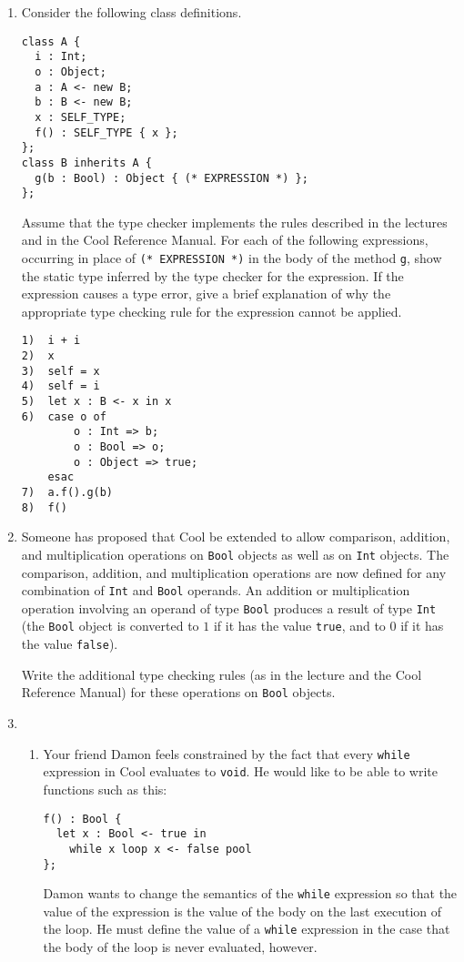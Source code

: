 \documentclass[11pt]{article}
\begin{document}
\begin{enumerate}

\item Consider the following class definitions.
\begin{verbatim}
class A {
  i : Int;
  o : Object;
  a : A <- new B;
  b : B <- new B;
  x : SELF_TYPE;
  f() : SELF_TYPE { x };
};
class B inherits A {
  g(b : Bool) : Object { (* EXPRESSION *) };
};
\end{verbatim}

Assume that the type checker implements the rules described in the
lectures and in the Cool Reference Manual.  For each of the following
expressions, occurring in place of \texttt{(* EXPRESSION *)} in the
body of the method \texttt{g}, show the static type inferred by the
type checker for the expression.  If the expression causes a type
error, give a brief explanation of why the appropriate type checking
rule for the expression cannot be applied.
\begin{verbatim}
1)  i + i
2)  x
3)  self = x
4)  self = i
5)  let x : B <- x in x
6)  case o of
        o : Int => b;
        o : Bool => o;
        o : Object => true;
    esac
7)  a.f().g(b)
8)  f()
\end{verbatim}

\item Someone has proposed that Cool be extended to allow comparison,
addition, and multiplication operations on \texttt{Bool} objects as
well as on \texttt{Int} objects.  The comparison, addition, and
multiplication operations are now defined for any combination of
\texttt{Int} and \texttt{Bool} operands.  An addition or
multiplication operation involving an operand of type \texttt{Bool}
produces a result of type \texttt{Int} (the \texttt{Bool} object is
converted to $1$ if it has the value \texttt{true}, and to $0$ if it
has the value \texttt{false}).

Write the additional type checking rules (as in the lecture and the
Cool Reference Manual) for these operations on \texttt{Bool} objects.

\item
\begin{enumerate}
\item Your friend Damon feels constrained by the fact that every
\texttt{while} expression in Cool evaluates to \texttt{void}.  He
would like to be able to write functions such as this:
\begin{verbatim}
f() : Bool {
  let x : Bool <- true in
    while x loop x <- false pool
};
\end{verbatim}
Damon wants to change the semantics of the \texttt{while} expression
so that the value of the expression is the value of the body on the
last execution of the loop.  He must define the value of a
\texttt{while} expression in the case that the body of the loop is
never evaluated, however.


\end{enumerate}
\end{enumerate}
\end{document}
